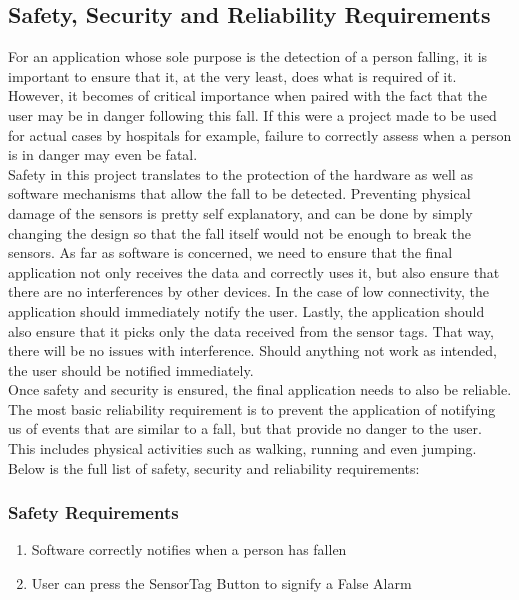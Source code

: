 \documentclass[hidelinks,conference,12pt]{IEEETran}
\begin{document}
\subsection{Safety, Security and Reliability Requirements}
For an application whose sole purpose is the detection of a person falling, it is important to ensure that it, at the very least, does what is required of it. However, it becomes of critical importance when paired with the fact that the user may be in danger following this fall. If this were a project made to be used for actual cases by hospitals for example, failure to correctly assess when a person is in danger may even be fatal. 
\\Safety in this project translates to the protection of the hardware as well as software mechanisms that allow the fall to be detected. Preventing physical damage of the sensors is pretty self explanatory, and can be done by simply changing the design so that the fall itself would not be enough to break the sensors. As far as software is concerned, we need to ensure that the final application not only receives the data and correctly uses it, but also ensure that there are no interferences by other devices. In the case of low connectivity, the application should immediately notify the user. Lastly, the application should also ensure that it picks only the data received from the sensor tags. That way, there will be no issues with interference. Should anything not work as intended, the user should be notified immediately.\\
Once safety and security is ensured, the final application needs to also be reliable. The most basic reliability requirement is to prevent the application of notifying us of events that are similar to a fall, but that provide no danger to the user. This includes physical activities such as walking, running and even jumping. Below is the full list of safety, security and reliability requirements:\\

\subsubsection{Safety Requirements}

\begin{enumerate}
	\item Software correctly notifies when a person has fallen
	\item User can press the SensorTag Button to signify a False Alarm
\end{enumerate}
\end{document}
